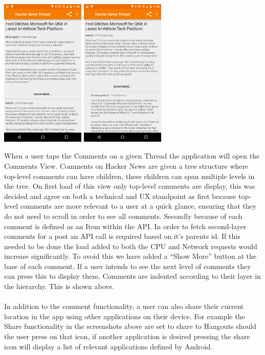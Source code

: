 \documentclass[11pt]{article}
\begin{document}
\begin{center}
\includegraphics[width=0.3\textwidth]{comments.png}
\includegraphics[width=0.3\textwidth]{commentsExpanded.png}
\end{center}

When a user taps the Comments on a given Thread the application will open the Comments View. Comments on Hacker News are given a tree structure where top-level comments can have children, these children can span multiple levels in the tree. On first load of this view only top-level comments are display, this was decided and agree on both a technical and UX standpoint as first because top-level comments are more relevant to a user at a quick glance, ensuring that they do not need to scroll in order to see all comments. Secondly because of each comment is defined as an Item within the API. In order to fetch second-layer comments for a post an API call is required based on it's parents id. If this needed to be done the load added to both the CPU and Network requests would increase significantly. To avoid this we have added a “Show More” button at the base of each comment. If a user intends to see the next level of comments they can press this to display them. Comments are indented according to their layer in the hierarchy. This is shown above.
\\
\\
In addition to the comment functionality, a user can also share their current location in the app using other applications on their device. For example the Share functionality in the screenshots above are set to share to Hangouts should the user press on that icon, if another application is desired pressing the share icon will display a list of relevant applications defined by Android. 
\end{document}
